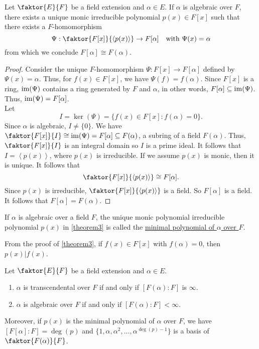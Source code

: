 \documentclass[11pt]{article}
\newcommand{\cyclic}[1]{\left\langle #1 \right\rangle}
\newcommand{\quotient}[2]{\faktor{#1}{#2}}
\begin{document}
\begin{theorem} \label{theorem3}
Let $\quotient{E}{F}$ be a field extension and $\alpha \in E$. If $\alpha$ is algebraic over
$F$, there exists a unique monic irreducible polynomial $p(x) \in F[x]$ such
that there exists a $F$-homomorphism
\begin{equation*}
\Psi:\quotient{F[x]}{\cyclic{p(x)}} \to F[\alpha] \quad \text{with } \Psi(x) = \alpha
\end{equation*}
from which we conclude $F[\alpha] \cong F(\alpha)$.
\end{theorem}
\begin{proof}
Consider the unique $F$-homomorphism $\Psi: F[x] \to F[\alpha]$ defined by
$\Psi(x) = \alpha$. Thus, for $f(x) \in F[x]$, we have $\Psi(f) = f(\alpha)$.
Since $F[x]$ is a ring, $\operatorname{im}(\Psi)$ contains a ring generated by $F$ and
$\alpha$, in other words, $F[\alpha] \subseteq \operatorname{im}(\Psi)$. Thus, $\operatorname{im}(\Psi) =
F[\alpha]$.\\
Let
\begin{equation*}
I = \ker(\Psi) = \{f(x) \in F[x] : f(\alpha) = 0 \}.
\end{equation*}
Since $\alpha$ is algebraic, $I \neq \{0\}$. We have $\quotient{F[x]}{I} \cong
\im(\Psi) = F[\alpha] \subseteq F(\alpha)$, a subring of a field $F(\alpha)$. Thus,
$\quotient{F[x]}{I}$ is an integral domain so $I$ is a prime ideal. It follows that
$I = \cyclic{p(x)}$, where $p(x)$ is irreducible. If we assume $p(x)$ is
monic, then it is unique. It follows that
\begin{equation*}
\quotient{F[x]}{\cyclic{p(x)}}\cong F[\alpha].
\end{equation*}
Since $p(x)$ is irreducible, $\quotient{F[x]}{\cyclic{p(x)}}$ is a field. So
$F[\alpha]$ is a field. It follows that $F[\alpha] = F(\alpha)$.
\end{proof}
\begin{definition}
If $\alpha$ is algebraic over a field $F$, the unique monic polynomial
irreducible polynomial $p(x)$ in \cref{theorem3} is called the \underline{minimal
polynomial of $\alpha$ over $F$}.
\end{definition}
\begin{remark}
From the proof of \cref{theorem3}, if $f(x) \in F[x]$ with $f(\alpha) = 0$, then
$p(x) \big| f(x)$.
\end{remark}
\begin{theorem} \label{theorem4}
Let $\quotient{E}{F}$ be a field extension and $\alpha \in E$.
\begin{enumerate}
\item $\alpha$ is transcendental over $F$ if and only if $[F(\alpha):F]$ is
$\infty$.
\item $\alpha$ is algebraic over $F$ if and only if $[F(\alpha):F] < \infty$.
\end{enumerate}
Moreover, if $p(x)$ is the minimal polynomial of $\alpha$ over $F$, we have
$[F[\alpha]:F] = \deg(p)$ and $\{1, \alpha, \alpha^2, \dots,
\alpha^{\deg (p) - 1}\}$ is a basis of $\quotient{F(\alpha)}{F}$.
\end{theorem}
\end{document}
